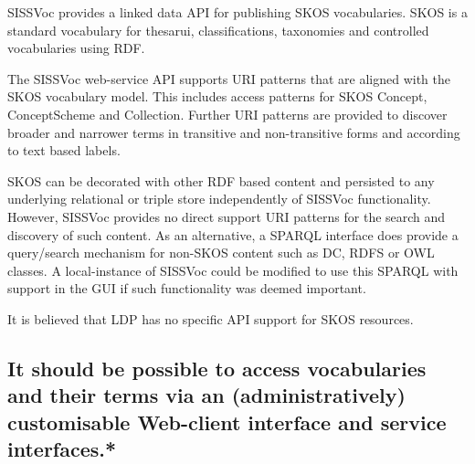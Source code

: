 \documentclass[10pt,a4paper]{article}
\begin{document}
\begin{flushleft}
  \item SISSVoc provides a linked data API for publishing SKOS vocabularies. SKOS
  is a standard vocabulary for thesarui, classifications, taxonomies and
controlled vocabularies using RDF.

   \item  The SISSVoc web-service API supports URI patterns that are aligned with the SKOS
  vocabulary model. This includes access patterns for SKOS Concept,
  ConceptScheme and Collection. Further URI patterns are provided to discover
  broader and narrower terms in transitive and non-transitive forms and according
  to text based labels. 

     \item SKOS can be decorated with other RDF based content and persisted to
  any underlying relational or triple store independently of SISSVoc
  functionality. However, SISSVoc provides no direct support URI patterns for the
  search and discovery of such content. As an alternative, a SPARQL interface
  does provide a query/search mechanism for non-SKOS content such as DC, RDFS or
  OWL classes. A local-instance of SISSVoc could be modified to use this SPARQL
  with support in the GUI if such functionality was deemed important. 

  \item It is believed that LDP has no specific API support for SKOS resources.

% 
% 
% 

  \subsection{
  It should be possible to access vocabularies and their terms via an 
  (administratively) customisable Web-client interface and service interfaces.* } 


\end{flushleft}
\end{document}
